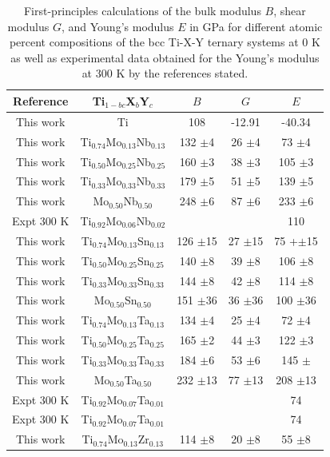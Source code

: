\newpage
\begin{longtable}[H]{ c c c c c }
	\caption{First-principles calculations of the bulk modulus $B$, shear modulus $G$, and Young's modulus $E$ in GPa for different atomic percent compositions of the bcc Ti-X-Y ternary systems at 0 K as well as experimental data obtained for the Young's modulus at 300 K by the references stated.} 	\label{Ch6-table:tixyelasdata} \\
	\hline
	Reference & Ti$_{1-bc}$X$_b$Y$_c$ & $B$ &$G$ & $E$\\
	\hline
	\endhead
	\hline
	\endfoot
	This work & Ti & 108 & -12.91 & -40.34\\
	This work & Ti$_{0.74}$Mo$_{0.13}$Nb$_{0.13}$ & 132 $\pm$4 & 26 $\pm$4 & 73 $\pm$4\\
	This work & Ti$_{0.50}$Mo$_{0.25}$Nb$_{0.25}$ & 160 $\pm$3 & 38 $\pm$3 & 105 $\pm$3\\
	This work & Ti$_{0.33}$Mo$_{0.33}$Nb$_{0.33}$ & 179 $\pm$5 & 51 $\pm$5 & 139 $\pm$5\\
	This work & Mo$_{0.50}$Nb$_{0.50}$ & 248 $\pm$6 & 87 $\pm$6 & 233 $\pm$6\\
	Expt 300 K \cite{Niinomi2012} & Ti$_{0.92}$Mo$_{0.06}$Nb$_{0.02}$ & & & 110\\
	This work & Ti$_{0.74}$Mo$_{0.13}$Sn$_{0.13}$ & 126 $\pm$15 & 27 $\pm$15 & 75 +$\pm$15\\
	This work & Ti$_{0.50}$Mo$_{0.25}$Sn$_{0.25}$ & 140 $\pm$8 & 39 $\pm$8 & 106 $\pm$8\\
	This work & Ti$_{0.33}$Mo$_{0.33}$Sn$_{0.33}$ & 144 $\pm$8 & 42 $\pm$8 & 114 $\pm$8\\
	This work & Mo$_{0.50}$Sn$_{0.50}$ & 151 $\pm$36 & 36 $\pm$36 & 100 $\pm$36\\
	This work & Ti$_{0.74}$Mo$_{0.13}$Ta$_{0.13}$ & 134 $\pm$4 & 25 $\pm$4 & 72 $\pm$4\\
	This work & Ti$_{0.50}$Mo$_{0.25}$Ta$_{0.25}$ & 165 $\pm$2 & 44 $\pm$3 & 122 $\pm$3\\
	This work & Ti$_{0.33}$Mo$_{0.33}$Ta$_{0.33}$ & 184 $\pm$6 & 53 $\pm$6 & 145 $\pm$\\
	This work & Mo$_{0.50}$Ta$_{0.50}$ & 232 $\pm$13 & 77 $\pm$13 & 208 $\pm$13\\
	Expt 300 K \cite{Mohammed2014} & Ti$_{0.92}$Mo$_{0.07}$Ta$_{0.01}$ & & & 74\\
	Expt 300 K \cite{Niinomi2012}  & Ti$_{0.92}$Mo$_{0.07}$Ta$_{0.01}$ & & & 74\\
	This work & Ti$_{0.74}$Mo$_{0.13}$Zr$_{0.13}$ & 114 $\pm$8 & 20 $\pm$8 & 55 $\pm$8\\

\end{longtable}
